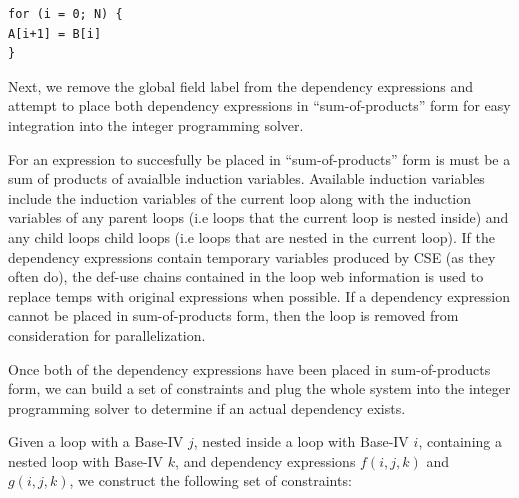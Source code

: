 \documentclass[11pt]{article}
\begin{document}
\begin{verbatim}
for (i = 0; N) {
A[i+1] = B[i]
}
\end{verbatim}

Next, we remove the global field label from the dependency expressions
and attempt to place both dependency expressions in
``sum-of-products'' form for easy integration into the integer
programming solver. 

For an expression to succesfully be placed in ``sum-of-products'' form
is must be a sum of products of avaialble induction
variables. Available induction variables include the induction
variables of the current loop along with the induction variables of
any parent loops (i.e loops that the current loop is nested inside)
and any child loops child loops (i.e loops that are nested in the
current loop). If the dependency expressions contain temporary variables produced
by CSE (as they often do), the def-use chains contained in the loop
web information is used to replace temps with original expressions
when possible. If a dependency expression cannot be placed in sum-of-products form,
then the loop is removed from consideration for parallelization. 

Once both of the dependency expressions have been placed in
sum-of-products form, we can build a set of constraints and plug the
whole system into the integer programming solver to determine if an
actual dependency exists. 

Given a loop with a Base-IV $j$, nested inside a loop with Base-IV
$i$, containing a nested loop with Base-IV $k$, and dependency
expressions $f(i, j, k)$ and $g(i, j, k)$, we construct the following
set of constraints: 
\end{document}
